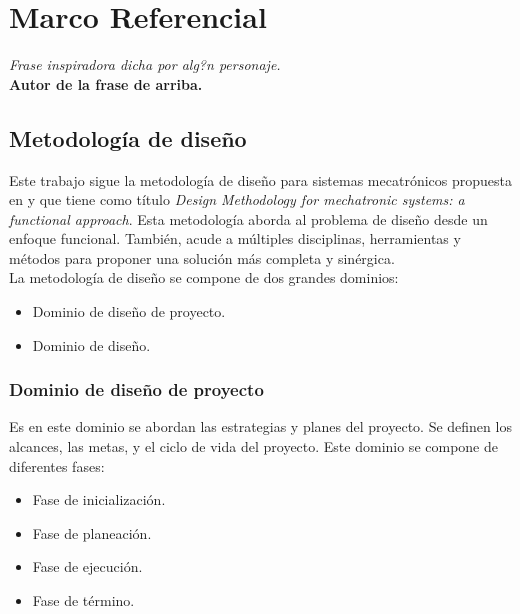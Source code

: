 \chapter{Marco Referencial} \label{ch:marcoref}

\begin{flushright}
\small\textit{Frase inspiradora dicha por alg?n personaje.}\\
		\small\textbf{Autor de la frase de arriba.}
\end{flushright}

	\section{Metodolog\'ia de dise\~{n}o} \label{sec:metodologia}
Este trabajo sigue la metodolog\'ia de dise\~{n}o para sistemas mecatr\'onicos propuesta en \cite{diegoflores_2018} y que tiene como t\'itulo \textit{Design Methodology for mechatronic systems: a functional approach}. Esta metodolog\'ia aborda al problema de dise\~{n}o desde un enfoque funcional. Tambi\'en, acude a m\'ultiples disciplinas, herramientas y m\'etodos para proponer una soluci\'on m\'as completa y sin\'ergica.\\

\noindent La metodolog\'ia de dise\~{n}o se compone de dos grandes dominios:

\begin{itemize}
	\item Dominio de dise\~{n}o de proyecto.
	\item Dominio de dise\~{n}o.
\end{itemize}

		\subsection*{Dominio de dise\~{n}o de proyecto}
\noindent Es en este dominio se abordan las estrategias y planes del proyecto. Se definen los alcances, las metas, y el ciclo de vida del proyecto. Este dominio se compone de diferentes fases:

\begin{itemize}
	\item Fase de inicializaci\'on. 
	\item Fase de planeaci\'on.
	\item Fase de ejecuci\'on.
	\item Fase de t\'ermino.
\end{itemize}


